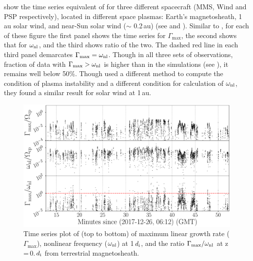          show the time series equivalent of
         for three different spacecraft (MMS, Wind and PSP respectively),
        located in different space plasmas: Earth's magnetosheath, 1\,au solar wind, and near-Sun
        solar wind ($\sim$ 0.2\,au) (see  and ). Similar to
        , for each of these figure the first panel shows the time series for
        $\Gamma_{\max}$, the second shows that for $\omega_{\rm nl}$, and the third shows ratio of
        the two. The dashed red line in each third panel demarcates $\Gamma_{\max} = \omega_{\rm
        nl}$. Though in all three sets of observations, fraction of data with $\Gamma_{\max} >
        \omega_{\rm nl}$ is higher than in the simulations (see ), it remains well
        below 50\%. Though \citet{Klein2018} used a different method to compute the condition of
        plasma instability and a different condition for calculation of $\omega_{\rm nl}$, they
        found a similar result for solar wind at 1\,au.
        \begin{figure}
            \begin{center}
                \includegraphics[width=1.\textwidth]{figures/chap7/mms_gamma_omega_ratio_2017-12-26_2017-12-26_00000000_00015856.pdf}
                \caption[Comparison plot of $\Gamma_{\max}$, $\omega_{\rm nl}$ and
                $\Gamma_{\max}/\omega_{\rm nl}$ for \texttt{mms} dataset]{Time series plot of (top
                to bottom) of maximum linear growth rate ($\Gamma_{\max}$), nonlinear frequency
                ($\omega_{\rm nl}$) at 1\,$d_{\rm i}$, and the ratio $\Gamma_{\max}/\omega_{\rm nl}$
                at z\,=\,0.\,$d_{\rm i}$ from terrestrial magnetosheath.}
                \label{fig:ratio_mms}
            \end{center}
        \end{figure}

